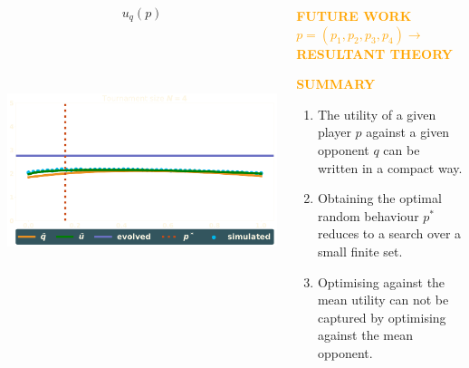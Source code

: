 \documentclass[usenames,dvipsnames,t]{beamer}
\begin{document}
\begin{columns}
\begin{column}{.7\linewidth}
\begin{columns}
\begin{column}{.5\linewidth}
\begin{center}
                \textbf{\[u_q(p)\]} \\
                 \\
                 \\
                 \\
                \includegraphics[width=.5\textwidth]{static/tournament}

            \end{center}
        \end{column}
    \end{columns}
    \end{column}
    \begin{column}{.2\linewidth}
        \begin{center}
            \textcolor{orange}{\textbf{\Large{FUTURE WORK}}} \\
            \textcolor{orange}{\textbf{ \(p=(p_1, p_2, p_3, p_4) \rightarrow\) \small{ RESULTANT THEORY}}}
        \end{center}
    \begin{center}
        
    \end{center}
            \vspace{2cm}

            \begin{center}
                \textcolor{orange}{\textbf{\Large{SUMMARY}}}
            \begin{center}
                \begin{enumerate}
                    \item The utility of a given player \(p\) against a given opponent \(q\) 
                    can be written in a compact way.
                    \item Obtaining the optimal random behaviour \(p ^ *\) reduces to a search over a small finite set.
                    \item Optimising against the mean utility can not be captured by optimising against the mean opponent.
                \end{enumerate}
            \end{center}
        \end{center}
    \end{column}
\end{columns}
\vspace{1.5cm}
\end{document}
